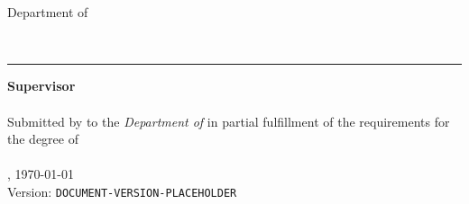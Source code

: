 \begin{titlepage}
    \begin{center}
        {\Large%
           \textsc{\university{}}%
        }
        \\\medskip
        {%
            \textbf{%
                \universityFaculty{}
            }\\
            Department of \universityDepartment{}%
        }
        \\\vfill
        {\Huge%
            \sffamily{%
                \textbf\documentTitle{}%
            }\par%
        }
        \medskip
        {\large%
            \textsl{%
                \documentSubtitle{}%
            }
        }
        \\\vfill
        {\Large%
            \textbf{\shortTitle{}}%
        }
    \end{center}
	\vfill
	\rule{\textwidth}{.4pt}
	\vfill
    \begin{flushleft}
        \textbf{Supervisor}\\
        \medskip
        \researchAdvisor{}\\
        \bigskip
        Submitted by \textbf{\documentAuthor{}} to the \textsl{Department of \universityDepartment{}} in partial fulfillment of the requirements for the degree of\\
        \textbf{\academicDegree{}}\\
        \medskip{}
        \documentPlace{}, \germanDate{}\today{}\\
        Version: \texttt{DOCUMENT-VERSION-PLACEHOLDER}\\
    \end{flushleft}
\end{titlepage}
